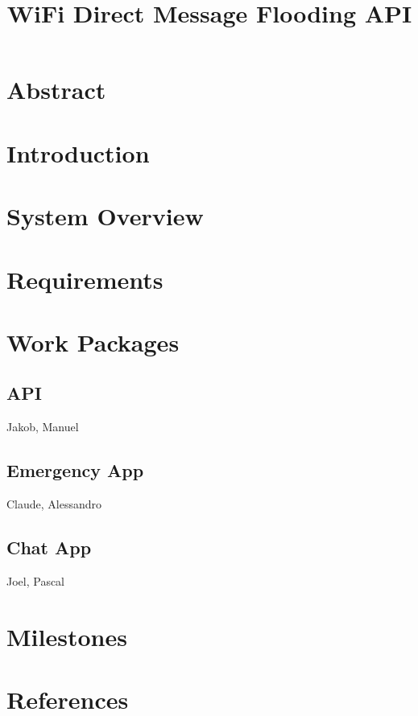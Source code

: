 \documentclass[10pt,a4paper]{report}
\title{WiFi Direct Message Flooding API}
\begin{document}
	
	\maketitle
	
	\section{Abstract}
	
	\section{Introduction}
	
	\section{System Overview}
	
	\section{Requirements}
	
	\section{Work Packages}
	
		\subsection{API}
			Jakob, Manuel
		
		\subsection{Emergency App}
			Claude, Alessandro
		
		\subsection{Chat App}
			Joel, Pascal
	
	\section{Milestones}
	
	\section{References}
	
	
\end{document}

